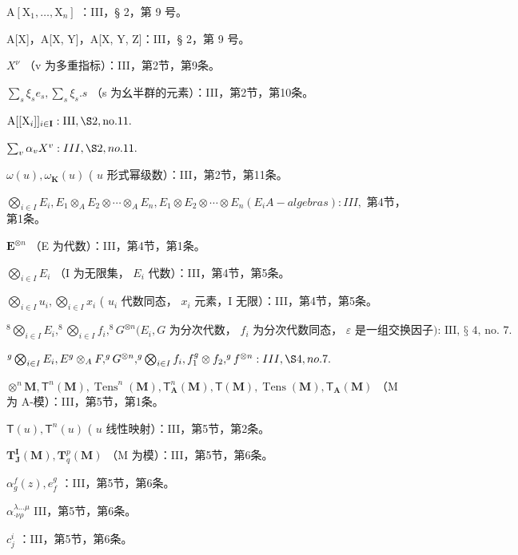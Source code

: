 \(\mathrm{A}[\mathrm{X}_1,\dots ,\mathrm{X}_n]\) ：III，§ 2，第 9 号。

A{[}X{]}，A{[}X, Y{]}，A{[}X, Y, Z{]}：III，§ 2，第 9 号。

\(X^{\nu}\) （v 为多重指标）：III，第2节，第9条。

\(\sum_{s} \xi_{s} e_{s}, \sum_{s} \xi_{s}. s\) （s 为幺半群的元素）：III，第2节，第10条。

\(\mathrm{A}[[\mathrm{X}_i]]_{i \in \mathbf{I}}: \mathrm{III}, \S 2, \mathrm{no.} 11.\)

\(\sum_{v} \alpha_v X^v: III, \S 2, no. 11.\)

\(\omega(u), \omega_{\mathbf{K}}(u)\) ( \(u\) 形式幂级数）：III，第2节，第11条。

\(\bigotimes_{i \in I} E_i, E_1 \otimes_A E_2 \otimes \cdots \otimes_A E_n, E_1 \otimes E_2 \otimes \cdots \otimes E_n (E_i A-algebras): III,\) 第4节，第1条。

\(\mathbf{E}^{\otimes n}\) （E 为代数）：III，第4节，第1条。

\(\bigotimes_{i \in I} E_i\) （I 为无限集， \(E_i\) 代数）：III，第4节，第5条。

\(\bigotimes_{i \in I} u_i, \bigotimes_{i \in I} x_i\) ( \(u_i\) 代数同态， \(x_i\) 元素，I 无限）：III，第4节，第5条。

\(^{8}\bigotimes_{i\in I}E_{i},^{8}\bigotimes_{i\in I}f_{i},^{8}G^{\otimes n}(E_{i},G\text{ 为分次代数， }f_{i}\text{ 为分次代数同态， }\varepsilon\text{ 是一组交换因子): III, § 4, no. 7.}\)

\(^{g}\bigotimes_{i\in I}E_{i},E^{g}\otimes_{A}F,^{g}G^{\otimes n},^{g}\bigotimes_{i\in I}f_{i},f_{1}^{g}\otimes f_{2},^{g}f^{\otimes n}:III,\S4,no.7.\)

\(\otimes^{n}\mathbf{M},\mathsf{T}^{n}(\mathbf{M}),\operatorname {Tens}^{n}(\mathbf{M}),\mathsf{T}_{\mathbf{A}}^{n}(\mathbf{M}),\mathsf{T}(\mathbf{M}),\operatorname {Tens}(\mathbf{M}),\mathsf{T}_{\mathbf{A}}(\mathbf{M})\) （M 为 A-模）：III，第5节，第1条。

\(\mathsf{T}(u), \mathsf{T}^n(u)\) ( \(u\) 线性映射）：III，第5节，第2条。

\(\mathbf{T}_{\mathbf{J}}^{\mathbf{I}}(\mathbf{M}), \mathbf{T}_{q}^{p}(\mathbf{M})\) （M 为模）：III，第5节，第6条。

\(\alpha_{g}^{f}(z), e_{f}^{g}\) ：III，第5节，第6条。

\(\alpha_{\cdot \nu \rho}^{\lambda \dots \mu}\) III，第5节，第6条。

\(c_{j}^{i}\) ：III，第5节，第6条。

